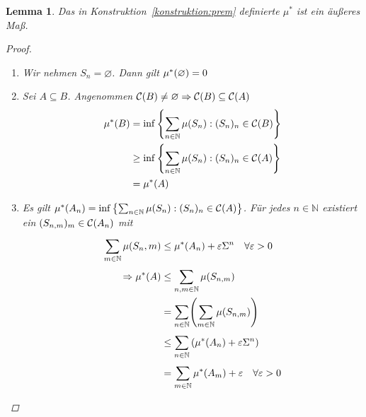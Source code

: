 \documentclass[11pt, twoside, a4paper]{article}
\theoremstyle{plain}
\newtheorem{lemma}[blockelement]{Lemma}
\numberwithin{equation}{subsection}
\newcommand{\set}[1]{\left\{#1\right\}}
\newcommand{\pair}[1]{\left(#1\right)}
\newcommand{\of}[1]{\mathopen{}\mathclose{}\bgroup\left(#1\aftergroup\egroup\right)}
\newcommand{\impl}[0]{\Rightarrow{}}
\renewcommand{\emptyset}{\varnothing}
\newcommand{\theoremescape}{\leavevmode}
\newcommand{\N}{\mathbb{N}}
\newcommand{\mC}{\mathcal{C}}
\begin{document}
    \begin{lemma}
        Das in Konstruktion~\ref{konstruktion:prem} definierte $\mu^{\ast}$ ist ein äußeres Maß.
        \begin{proof}
            \theoremescape
            \begin{enumerate}[label=(\roman*)]
                \item Wir nehmen $S_n = \emptyset$. Dann gilt $\mu^{\ast}\of{\emptyset} = 0$
                \item Sei $A\subseteq B$. Angenommen $\mC\of{B} \neq \emptyset \impl \mC\of{B} \subseteq \mC\of{A}$
                \begin{align*}
                    \mu^{\ast}\of{B} &= \inf\set{\sum_{n\in\N}^{} \mu\of{S_n}: (S_n)_n \in\mC\of{B}}\\
                    &\geq \inf\set{\sum_{n\in\N}^{} \mu\of{S_n}: (S_n)_n \in\mC\of{A}}\\
                    &= \mu^{\ast}\of{A}
                \end{align*}
                \item Es gilt $\mu^{\ast}\of{A_n} = \inf \set{\sum_{n\in\N}^{} \mu\of{S_n}: (S_n)_n \in\mC\of{A}}$. Für jedes $n\in\N$ existiert ein $(S_{n,m})_m \in\mC\of{A_n}$ mit
                \begin{align*}
                    \sum_{m\in\N}^{} \mu\of{S_n,m} &\leq \mu^{\ast}\of{A_n} + \varepsilon \Sigma^n\quad\forall\varepsilon > 0\\
                    \impl \mu^{\ast}\of{A} &\leq \sum_{n,m\in\N}^{} \mu\of{S_{n,m}}\\
                    &= \sum_{n\in\N}^{} \of{\sum_{m\in\N}^{} \mu\of{S_{n,m}}}\\
                    &\leq \sum_{n\in\N}^{} \pair{\mu^{\ast}\of{A_n} + \varepsilon\Sigma^n}\\
                    &= \sum_{m\in\N}^{} \mu^{\ast}\of{A_m} + \varepsilon\quad\forall\varepsilon > 0\qedhere
                \end{align*}
            \end{enumerate}
        \end{proof}
    \end{lemma}
\end{document}
